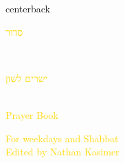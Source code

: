 \documentclass[
coverheight=8.5in,
coverwidth=5.5in,
spinewidth=.659in,
bleedwidth=.125in,
marklength=0in,
12pt,
pagecolor=black,
]{bookcover}
\newcommand{\hebtext}[1]{
\begin{hebrew}
	#1
\end{hebrew}
}
\begin{document}
\begin{bookcover}
	\begin{bookcoverelement}{center}{back}
		\begin{Huge}
			\textcolor{gold}{\hebtext{ סדור }}\\
			\textcolor{gold}{\hebtext{ישרים לשון}}\\
			\textcolor{gold}{Prayer Book}
				
		\end{Huge}
		\vspace{2\baselineskip}
		\begin{large}
			\textcolor{gold}{For weekdays and Shabbat\\Edited by Nathan Kasimer}
		\end{large}
	\end{bookcoverelement}
	\end{bookcover}
	
\end{document}
